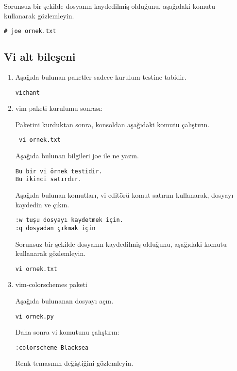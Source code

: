 \documentclass[a4paper,10pt]{article}
\begin{document}
Sorunsuz bir şekilde dosyanın kaydedilmiş olduğunu, aşağıdaki komutu kullanarak gözlemleyin.
\begin{verbatim}
# joe ornek.txt 
\end{verbatim}

\subsection*{Vi alt bileşeni}

\begin{enumerate}

\item Aşağıda bulunan paketler sadece kurulum testine tabidir.
\begin{verbatim}
vichant
\end{verbatim}


\item vim paketi kurulumu sonrası:

Paketini kurduktan sonra, konsoldan aşağıdaki komutu çalıştırın.

\begin{verbatim}
 vi ornek.txt
\end{verbatim}

Aşağıda bulunan bilgileri joe ile ne yazın.
\begin{verbatim}
Bu bir vi örnek testidir.
Bu ikinci satırdır.
\end{verbatim}

Aşağıda bulunan komutları, vi editörü komut satırını kullanarak, dosyayı kaydedin ve çıkın.
\begin{verbatim}
:w tuşu dosyayı kaydetmek için.
:q dosyadan çıkmak için
\end{verbatim}

Sorunsuz bir şekilde dosyanın kaydedilmiş olduğunu, aşağıdaki komutu kullanarak gözlemleyin.
\begin{verbatim}
vi ornek.txt 
\end{verbatim}

\item vim-colorschemes paketi

Aşağıda bulunanan dosyayı açın.
\begin{verbatim}
vi ornek.py
\end{verbatim}

Daha sonra vi komutunu çalıştırın:
\begin{verbatim}
:colorscheme Blacksea
\end{verbatim}

Renk temasının değiştiğini gözlemleyin.


\end{enumerate}
\end{document}
